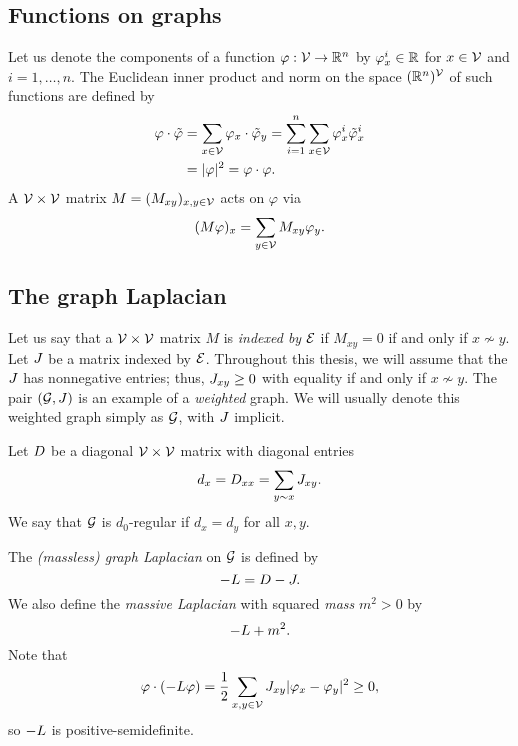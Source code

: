 
\subsection{Functions on graphs}

Let us denote the components of a function $\varphi : \mathcal{V} \rightarrow {\mathbb R}^n$ by
$\varphi^i_x \in {\mathbb R}$ for $x \in \mathcal{V}$ and $i = 1, \ldots, n$.
The Euclidean inner product and norm on the space $({\mathbb R}^n)^{\mathcal{V}}$ of such functions
are defined by
\begin{align}
\varphi\cdot\tilde\varphi
	&= \sum_{x\in\mathcal{V}} \varphi_x \cdot \tilde\varphi_y
  		= \sum_{i=1}^n \sum_{x\in\mathcal{V}} \varphi^i_x \tilde\varphi^i_x \\
	&=|\varphi|^2 = \varphi \cdot \varphi.
\end{align}
A $\mathcal{V}\times\mathcal{V}$ matrix $M = (M_{xy})_{x,y\in\mathcal{V}}$ acts on $\varphi$ via
\begin{equation}
(M \varphi)_x = \sum_{y\in\mathcal{V}} M_{xy} \varphi_y.
\end{equation}


\subsection{The graph Laplacian}

Let us say that a $\mathcal{V}\times\mathcal{V}$ matrix $M$ is \emph{indexed by} $\mathcal{E}$
if $M_{xy} = 0$ if and only if $x \not\sim y$.
Let $J$ be a matrix indexed by $\mathcal{E}$.
Throughout this thesis, we will assume that the $J$ has nonnegative entries;
thus, $J_{xy} \ge 0$ with equality if and only if $x\not\sim y$.
The pair $(\mathcal{G}, J)$ is an example of a \emph{weighted} graph.
We will usually denote this weighted graph simply as $\mathcal{G}$, with $J$
implicit.

Let $D$ be a diagonal $\mathcal{V}\times\mathcal{V}$ matrix with diagonal entries
\begin{equation}
d_x = D_{xx} = \sum_{y \sim x} J_{xy}.
\end{equation}
We say that $\mathcal{G}$ is $d_0$-regular if $d_x = d_y$ for all $x, y$.

The \emph{(massless) graph Laplacian} on $\mathcal{G}$ is defined by
\begin{equation}
-L = D - J.
\end{equation}
We also define the \emph{massive Laplacian} with squared \emph{mass} $m^2 > 0$
by
\begin{equation}
-L + m^2.
\end{equation}
Note that
\begin{equation}
\varphi \cdot (-L \varphi)
  =
\frac{1}{2} \sum_{x,y\in\mathcal{V}} J_{xy} |\varphi_x - \varphi_y|^2
  \ge
0,
\end{equation}
so $-L$ is positive-semidefinite.

